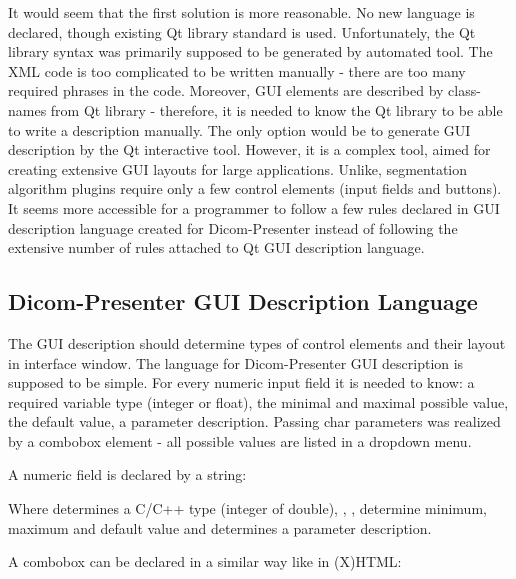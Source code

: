 It would seem that the first solution is more reasonable. No new language is declared, though existing Qt library standard is used. Unfortunately, the Qt library syntax was primarily supposed to be generated by automated tool. The XML code is too complicated to be written manually - there are too many required phrases in the code. Moreover, GUI elements are described by class-names from Qt library - therefore, it is needed to know the Qt library to be able to write a description manually. The only option would be to generate GUI description by the Qt interactive tool. However, it is a complex tool, aimed for creating extensive GUI layouts for large applications. Unlike, segmentation algorithm plugins require only a few control elements (input fields and buttons). It seems more accessible for a programmer to follow a few rules declared in GUI description language created for Dicom-Presenter instead of following the extensive number of rules attached to Qt GUI description language.

\subsection{Dicom-Presenter GUI Description Language}

The GUI description should determine types of control elements and their layout in interface window. The language for Dicom-Presenter GUI description is supposed to be simple. For every numeric input field it is needed to know: a required variable type (integer or float), the minimal and maximal possible value, the default value, a parameter description. Passing char parameters was realized by a combobox element - all possible values are listed in a dropdown menu.

A numeric field is declared by a string:


Where  determines a C/C++ type (integer of double), , ,  determine minimum, maximum and default value and  determines a parameter description.

A combobox can be declared in a similar way like in (X)HTML:

\noindent \indent {}\\
\indent \indent {}\\
\indent \indent {}\\
\indent {}

